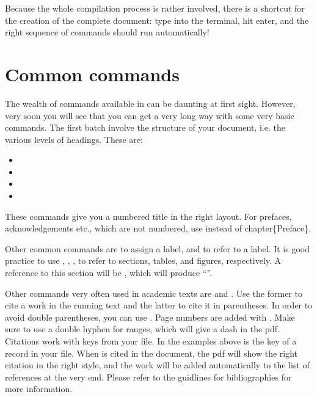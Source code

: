 Because the whole compilation process is rather involved, there is a shortcut for the creation of the complete document: type  into the terminal, hit enter, and the right sequence of commands should run automatically!


\section{Common commands}\label{sec:latex:commoncommands}
The wealth of commands available in \latex can be daunting at first sight. However, very soon you will see that you can get a very long way with some very basic commands. The first batch involve the structure of your document, i.e. the various levels of headings. These are:
\begin{itemize}
 \item {}
\item {}
\item {}
\item {}
\end{itemize}

These commands give you a numbered title in the right layout. For prefaces, acknowledgements etc., which are not numbered, use  instead of {{\bs}chapter\{Preface\}}.
 
Other common commands are 
to assign a label, and 
to refer to a label. It is good practice to use 
,
,
,
to refer to sections, tables, and figures, respectively. A reference to this section will be , which will produce ``''.

Other commands very often used in academic texts are  and . Use the former to cite a work in the running text and the latter to cite it in parentheses. In order to avoid double parentheses, you can use  . Page numbers are added with . Make sure to use a double hyphen for ranges, which will give a dash in the pdf. Citations work with keys from your \bibtex file. In the examples above  is the key of a record in your \bibtex file. When  is cited in the document, the pdf will show the right citation in the right style, and the work will be added automatically to the list of references at the very end. Please refer to the guidlines for bibliographies for more information.



